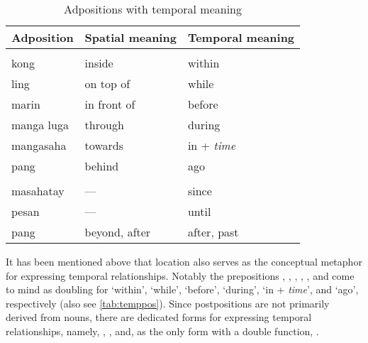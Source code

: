 \begin{table}\centering
\caption{Adpositions with temporal meaning}
\begin{tabu} to \linewidth {I X X}
\tableheaderfont\toprule
Adposition
	& Spatial meaning
	& Temporal meaning
	\\

\toprule

\tablesubheaderfont{} \\

\midrule

kong
	& inside
	& within
	\\

ling
	& on top of
	& while
	\\

marin
	& in front of
	& before
	\\

manga luga
	& through
	& during
	\\

mangasaha
	& towards
	& in + \textit{time}
	\\

pang
	& behind
	& ago
	\\

\midrule

\tablesubheaderfont{} \\

\midrule

masahatay
	& ---
	& since
	\\

pesan
	& ---
	& until
	\\

pang
	& beyond, after
	& after, past
	\\

\bottomrule
\end{tabu}

\label{tab:temppos}
\end{table}

It has been mentioned above that location also serves as the conceptual
metaphor for expressing temporal relationships. Notably the prepositions
, , , , , and
 come to mind as doubling for `within', `while',
`before', `during', `in + \emph{time}', and `ago', respectively (also see
\autoref{tab:temppos}). Since postpositions are not primarily derived from
nouns, there are dedicated forms for expressing temporal relationships, namely,
, , and, as the only
form with a double function, .

